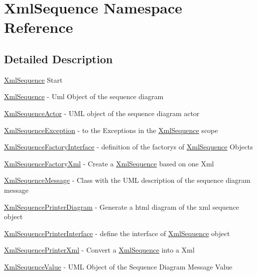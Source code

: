 \hypertarget{namespace_xml_sequence}{
\section{XmlSequence Namespace Reference}
\label{namespace_xml_sequence}
}


\subsection{Detailed Description}
\hyperlink{class_xml_sequence}{XmlSequence} Start

\hyperlink{class_xml_sequence}{XmlSequence} - Uml Object of the sequence diagram

\hyperlink{class_xml_sequence_actor}{XmlSequenceActor} - UML object of the sequence diagram actor

\hyperlink{class_xml_sequence_exception}{XmlSequenceException} - to the Exceptions in the \hyperlink{class_xml_sequence}{XmlSequence} scope

\hyperlink{interface_xml_sequence_factory_interface}{XmlSequenceFactoryInterface} - definition of the factorys of \hyperlink{class_xml_sequence}{XmlSequence} Objects

\hyperlink{class_xml_sequence_factory_xml}{XmlSequenceFactoryXml} - Create a \hyperlink{class_xml_sequence}{XmlSequence} based on one Xml

\hyperlink{class_xml_sequence_message}{XmlSequenceMessage} - Class with the UML description of the sequence diagram message

\hyperlink{class_xml_sequence_printer_diagram}{XmlSequencePrinterDiagram} - Generate a html diagram of the xml sequence object

\hyperlink{interface_xml_sequence_printer_interface}{XmlSequencePrinterInterface} - define the interface of \hyperlink{class_xml_sequence}{XmlSequence} object

\hyperlink{class_xml_sequence_printer_xml}{XmlSequencePrinterXml} - Convert a \hyperlink{class_xml_sequence}{XmlSequence} into a Xml

\hyperlink{class_xml_sequence_value}{XmlSequenceValue} - UML Object of the Sequence Diagram Message Value 

